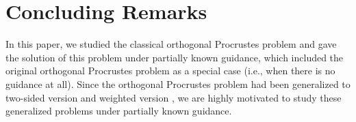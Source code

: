 \documentclass[titlepage,11pt,twoside]{article}
\begin{document}






\section{Concluding Remarks}
In this paper, we studied the classical orthogonal Procrustes problem and gave the solution of this problem under partially known guidance, which included the original orthogonal Procrustes problem as a special case (i.e., when there is no guidance at all). Since the orthogonal Procrustes problem had been generalized to two-sided version \cite{schonemann1968two} and weighted version \cite{Lissitz1976,Koschat1991}, we are highly motivated to study these generalized problems under partially known guidance.




\end{document}
